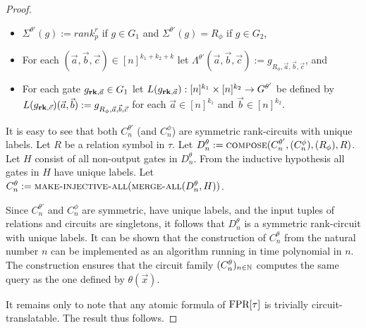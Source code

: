 \documentclass[../paper.tex]{subfiles}
\begin{document}
\begin{proof}
\begin{itemize}
  \item $\Sigma^{\theta'} (g) := rank^r_p$ if $g \in G_1$ and
    $\Sigma^{\theta'}(g) = R_\phi$ if $g \in G_2$,
  \item For each $(\vec{a}, \vec{b}, \vec{c}) \in [n]^{k_1 +k_2 + k}$ let
    $\Lambda^{\theta'} (\vec{a}, \vec{b}, \vec{c}) := g_{R_{\phi}, \vec{a},
      \vec{b}, \vec{c}}$, and

  \item For each gate $g_{\text{\textbf{rk}}, \vec{a}} \in G_1$ let $L(g_{\text{\textbf{rk}}, \vec{a}}):
    [n]^{k_1} \times [n]^{k_2} \rightarrow G^{\theta'}$ be defined by
    $L(g_{\text{\textbf{rk}}, \vec{c}})(\vec{a}, \vec{b}) := g_{R_\phi, \vec{a}, \vec{b},
      \vec{c}}$ for each $\vec{a} \in [n]^{k_1}$ and $\vec{b} \in [n]^{k_2}$.
  \end{itemize}
 
  It is easy to see that both $C^{\theta'}_n$ (and $C^{\phi}_n$) are symmetric
  rank-circuits with unique labels. Let $R$ be a relation symbol in $\tau$. Let
  $D^{\theta}_n := {\normalfont\textsc{compose}}(C^{\theta'}_n, (C^{\phi}_n), (R_\phi), R)$. Let
  $H$ consist of all non-output gates in $D^{\theta}_n$. From the inductive
  hypothesis all gates in $H$ have unique labels. Let $C^{\theta}_n :=
  {\normalfont\textsc{make-injective-all}}({\normalfont\textsc{merge-all}}(D^{\theta}_n, H))$.

  Since $C^{\theta'}_n$ and $C^{\phi}_n$ are symmetric, have unique labels, and
  the input tuples of relations and circuits are singletons, it follows that
  $D^{\theta}_n$ is a symmetric rank-circuit with unique labels. It can be shown
  that the construction of $C^{\theta}_n$ from the natural number $n$ can be
  implemented as an algorithm running in time polynomial in $n$. The
  construction ensures that the circuit family $(C^{\theta}_n)_{n \in \mathbb{N}}$
  computes the same query as the one defined by $\theta(\vec{x})$.
 
  It remains only to note that any atomic formula of $\text{\upshape FPR}[\tau]$ is trivially
  circuit-translatable. The result thus follows.
\end{proof}


\end{document}
